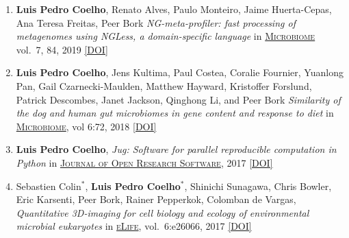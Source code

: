 \documentclass{article}
\newcommand\showdoi[1]{%
    \href{http://dx.doi.org/#1}{[DOI]}%
}
\newcommand\pubname[1]{\textsc{\uline{#1}}}
\newcommand\contribution[1]{\relax}
\newcommand\costar{${}^{*}$}
\begin{document}
\begin{enumerate}[resume]
\item \textbf{Luis Pedro Coelho}, Renato Alves, Paulo Monteiro, Jaime
Huerta-Cepas, Ana Teresa Freitas, Peer Bork \emph{NG-meta-profiler: fast
processing of metagenomes using NGLess, a domain-specific language} in
\pubname{Microbiome} vol.\ 7, 84, 2019 \showdoi{10.1186/s40168-019-0684-8}
\contribution{I conceived of the concept, co-wrote the software and the manuscript}

\item \textbf{Luis Pedro Coelho}, Jens Kultima, Paul Costea, Coralie Fournier,
Yuanlong Pan, Gail Czarnecki-Maulden, Matthew Hayward, Kristoffer Forslund,
Patrick Descombes, Janet Jackson, Qinghong Li, and Peer Bork \emph{Similarity
of the dog and human gut microbiomes in gene content and response to diet} in
\pubname{Microbiome}, vol 6:72, 2018 \showdoi{10.1186/s40168-018-0450-3}
\contribution{I designed and implemented the analysis strategy, wrote the first
version of the manuscript, and lead the subsequent incorporation of co-author
suggestions.}

\item \textbf{Luis Pedro Coelho}, \emph{Jug: Software for parallel reproducible
computation in Python} in \pubname{Journal of Open Research
Software}, 2017 \showdoi{10.5334/jors.161}
\contribution{I designed and implemented the software presented and wrote the
manuscript.}

\item Sebastien Colin\costar, \textbf{Luis Pedro Coelho}\costar, Shinichi
Sunagawa, Chris Bowler, Eric Karsenti, Peer Bork, Rainer Pepperkok, Colomban de
Vargas, \emph{Quantitative 3D-imaging for cell biology and ecology of
environmental microbial eukaryotes} in \pubname{eLife}, vol.\ 6:e26066, 2017
\showdoi{10.7554/eLife.26066.001}
\contribution{I designed and implemented the computational analysis necessary
for the method presented in the paper and participated in the writing of the
manuscript.}


\end{enumerate}
\end{document}
